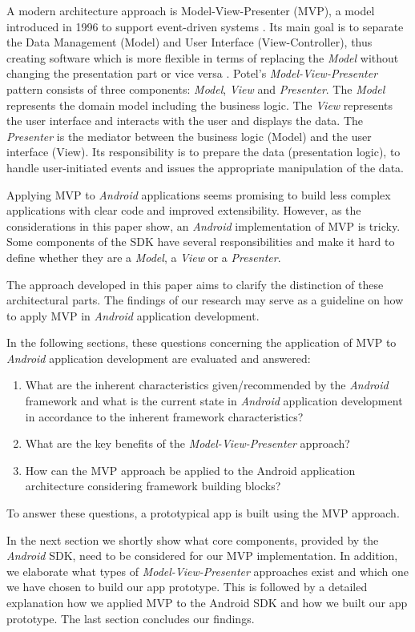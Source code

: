 
A modern architecture approach is Model-View-Presenter (MVP), a model introduced in 1996 to support event-driven systems \cite{TaligentMVP}. Its main goal is to separate the Data Management (Model) and User Interface (View-Controller), thus creating software which is more flexible in terms of replacing the \emph{Model} without changing the presentation part or vice versa \cite{PassiveMVC}.
Potel's \emph{Model-View-Presenter} pattern consists of three components: \emph{Model}, \emph{View} and \emph{Presenter}. The \emph{Model} represents the domain model including the business logic. The \emph{View} represents the user interface and interacts with the user and displays the data. The \emph{Presenter} is the mediator between the business logic (Model) and the user interface (View). Its responsibility is to prepare the data (presentation logic), to handle user-initiated events and issues the appropriate manipulation of the data.


Applying MVP to \emph{Android} applications seems promising to build less complex applications with clear code and improved extensibility. However, as the considerations in this paper show, an \emph{Android} implementation of MVP is tricky. Some components of the SDK have several responsibilities and make it hard to define whether they are a \emph{Model}, a \emph{View} or a \emph{Presenter}. 

The approach developed in this paper aims to clarify the distinction of these architectural parts. The findings of our research may serve as a guideline on how to apply MVP in \emph{Android} application development.


In the following sections, these questions concerning the application of MVP to \emph{Android} application development are evaluated and answered:

\begin{enumerate}[label={RQ\arabic*:}, leftmargin=0.95cm]
\item What are the inherent characteristics given/recommended by the \emph{Android} framework and what is the current state in \emph{Android} application development in accordance to the inherent framework characteristics?
\item What are the key benefits of the \emph{Model-View-Presenter} approach?
\item How can the MVP approach be applied to the Android application architecture considering framework building blocks?
\end{enumerate}

To answer these questions, a prototypical app is built using the MVP approach. 

In the next section we shortly show what core components, provided by the \emph{Android} SDK, need to be considered for our MVP implementation. In addition, we elaborate what types of \emph{Model-View-Presenter} approaches exist and which one we have chosen to build our app prototype. This is followed by a detailed explanation how we applied MVP to the Android SDK and how we built our app prototype. The last section concludes our findings.
